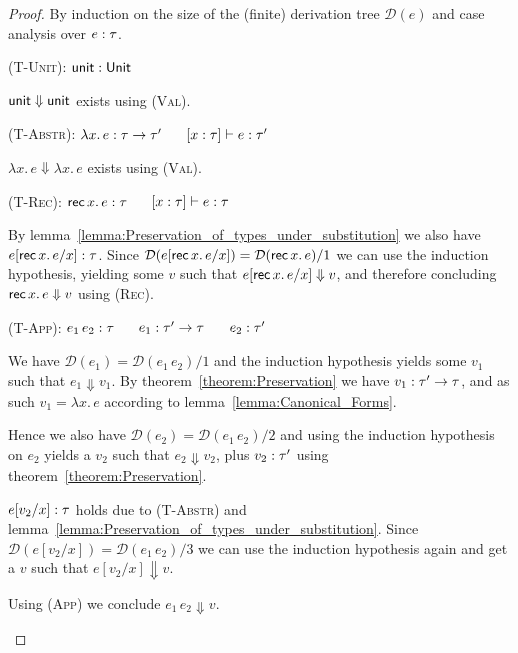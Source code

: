 \documentclass[12pt,a2paper,draft]{article}
\newcommand{\abstr}[2]{\ensuremath{\lambda{#1}.\,{#2}}}
\newcommand{\app}[2]{\ensuremath{{#1}\,{#2}}}
\newcommand{\rec}[2]{\ensuremath{{\normalfont\textsf{rec}}\,{#1}.\,{#2}}}
\newcommand{\unit}{\ensuremath{\normalfont\textsf{unit}}}
\newcommand{\Unit}{\ensuremath{\normalfont\textsf{Unit}}}
\newcommand{\tj}[2]{\mbox{\ensuremath{{#1}:{#2}}}}
\newcommand{\Tj}[3]{\mbox{\ensuremath{{#1}\vdash\tj{#2}{#3}}}}
\newcommand{\tree}[1]{\mathcal{D}(#1)}
\begin{document}
\begin{proof}
  By induction on the size of the (finite) derivation tree $\tree{e}$ and case analysis
  over $\tj{e}{\tau}$.
  \begin{description}
  \item \textsc{(T-Unit)}: $\tj{\unit}{\Unit}$

    $\unit \Downarrow \unit$ exists using \textsc{(Val)}.

  \item \textsc{(T-Abstr)}: $\tj{\abstr{x}{e}}{\tau \to \tau'}$ $\quad$ $\Tj{[x:\tau]}{e}{\tau'}$

    $\abstr{x}{e} \Downarrow \abstr{x}{e}$ exists using \textsc{(Val)}.

  \item \textsc{(T-Rec)}: $\tj{\rec{x}{e}}{\tau}$ $\quad$ $\Tj{[x:\tau]}{e}{\tau}$

    By lemma~\ref{lemma:Preservation_of_types_under_substitution}
    we also have $\tj{e[\rec{x}{e}/x]}{\tau}$. Since $\tree{e[\rec{x}{e}/x]} = \tree{\rec{x}{e}}/1$ we
    can use the induction hypothesis, yielding some $v$ such that $e[\rec{x}{e}/x] \Downarrow v$,
    and therefore concluding $\rec{x}{e} \Downarrow v$ using \textsc{(Rec)}.

  \item \textsc{(T-App)}: $\tj{\app{e_1}{e_2}}{\tau}$ $\quad$ $\tj{e_1}{\tau'\to\tau}$ $\quad$ $\tj{e_2}{\tau'}$

    We have $\tree{e_1} = \tree{\app{e_1}{e_2}}/1$ and the induction hypothesis yields
    some $v_1$ such that $e_1 \Downarrow v_1$. By theorem~\ref{theorem:Preservation} we
    have $\tj{v_1}{\tau'\to\tau}$, and as such $v_1 = \abstr{x}{e}$ according to lemma~\ref{lemma:Canonical_Forms}.

    Hence we also have $\tree{e_2} = \tree{\app{e_1}{e_2}}/2$ and using the induction hypothesis
    on $e_2$ yields a $v_2$ such that $e_2 \Downarrow v_2$, plus $\tj{v_2}{\tau'}$ using
    theorem~\ref{theorem:Preservation}.

    $\tj{e[v_2/x]}{\tau}$ holds due to \textsc{(T-Abstr)} and
    lemma~\ref{lemma:Preservation_of_types_under_substitution}. Since
    $\tree{e[v_2/x]} = \tree{\app{e_1}{e_2}}/3$ we can use the induction hypothesis again and
    get a $v$ such that $e[v_2/x] \Downarrow v$.

    Using \textsc{(App)} we conclude $\app{e_1}{e_2} \Downarrow v$.
  \end{description}
\end{proof}
\end{document}
